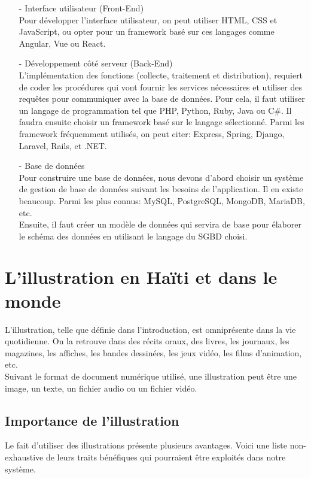 \begin{itemize}
	\item[-] Interface utilisateur (Front-End)\cite{frontendprogramming}\\
	Pour d\'evelopper l'interface utilisateur, on peut utiliser HTML, CSS et JavaScript, ou opter pour un framework bas\'e sur ces langages comme Angular, Vue ou React.
	\item[-] D\'eveloppement c\^ot\'e serveur (Back-End)\cite{backendprogramming}\\
	L'impl\'ementation des fonctions (collecte, traitement et distribution), requiert de coder les proc\'edures qui vont fournir les services n\'ecessaires et utiliser des requ\^etes pour communiquer avec la base de donn\'ees. Pour cela, il faut utiliser un langage de programmation tel que PHP, Python, Ruby, Java ou C\#. Il faudra ensuite choisir un framework bas\'e sur le langage s\'electionn\'e. Parmi les framework fr\'equemment utilis\'es, on peut citer: Express, Spring, Django, Laravel, Rails, et .NET.
	\item[-] Base de donn\'ees\\
	Pour construire une base de donn\'ees, nous devons d'abord choisir un syst\`eme de gestion de base de donn\'ees suivant les besoins de l'application. Il en existe beaucoup. Parmi les plus connus: MySQL, PostgreSQL, MongoDB, MariaDB, etc.\\
	Ensuite, il faut cr\'eer un mod\`ele de donn\'ees qui servira de base pour \'elaborer le sch\'ema des donn\'ees en utilisant le langage du SGBD choisi.


\end{itemize}






\section{L'illustration en Ha\"iti et dans le monde}
\label{SectionAvantageIllustrations}
L'illustration, telle que d\'efinie dans l'introduction, est omnipr\'esente dans la vie quotidienne. On la retrouve dans des r\'ecits oraux, des livres, les journaux, les magazines, les affiches, les bandes dessin\'ees, les jeux vid\'eo, les films d'animation, etc. \\
Suivant le format de document num\'erique utilis\'e, une illustration peut \^etre une image, un texte, un fichier audio ou un fichier vid\'eo.


\subsection{Importance de l'illustration}
Le fait d'utiliser des illustrations pr\'esente plusieurs avantages. Voici une liste non-exhaustive de leurs traits b\'en\'efiques qui pourraient \^etre exploit\'es dans notre syst\`eme.

